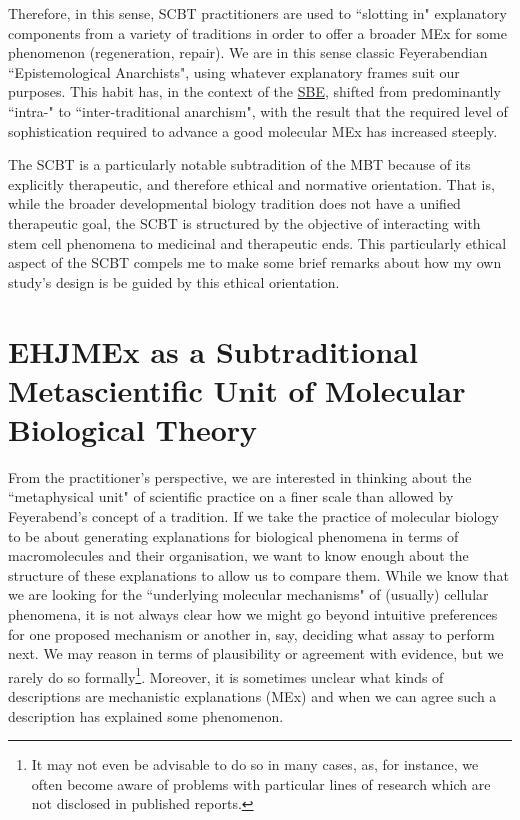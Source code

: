  Therefore, in this sense, SCBT practitioners are used to ``slotting in" explanatory components from a variety of traditions in order to offer a broader MEx for some phenomenon (regeneration, repair). We are in this sense classic Feyerabendian ``Epistemological Anarchists", using whatever explanatory frames suit our purposes. This habit has, in the context of the \hyperref[SBE]{SBE}, shifted from predominantly ``intra-" to ``inter-traditional anarchism", with the result that the required level of sophistication required to advance a good molecular MEx has increased steeply.
 
 The SCBT is a particularly notable subtradition of the MBT because of its explicitly therapeutic, and therefore ethical and normative orientation. That is, while the broader developmental biology tradition does not have a unified therapeutic goal, the SCBT is structured by the objective of interacting with stem cell phenomena to medicinal and therapeutic ends. This particularly ethical aspect of the SCBT compels me to make some brief remarks about how my own study's design is be guided by this ethical orientation.
 
\section {EHJMEx as a Subtraditional Metascientific Unit of Molecular Biological Theory}
\label{EHJMEx}

From the practitioner's perspective, we are interested in thinking about the ``metaphysical unit" of scientific practice on a finer scale than allowed by Feyerabend's concept of a tradition. If we take the practice of molecular biology to be about generating explanations for biological phenomena in terms of macromolecules and their organisation, we want to know enough about the structure of these explanations to allow us to compare them. While we know that we are looking for the ``underlying molecular mechanisms" of (usually) cellular phenomena, it is not always clear how we might go beyond intuitive preferences for one proposed mechanism or another in, say, deciding what assay to perform next. We may reason in terms of plausibility or agreement with evidence, but we rarely do so formally\footnote{It may not even be advisable to do so in many cases, as, for instance, we often become aware of problems with particular lines of research which are not disclosed in published reports.}. Moreover, it is sometimes unclear what kinds of descriptions are mechanistic explanations (MEx) and when we can agree such a description has explained some phenomenon.

